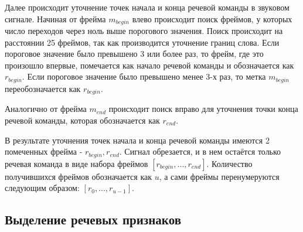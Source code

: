 Далее происходит уточнение точек начала и конца речевой команды в звуковом сигнале. Начиная от фрейма $m_{begin}$ влево происходит поиск фреймов, у которых число переходов через ноль выше порогового значения. Поиск происходит на расстоянии 25 фреймов, так как производится уточнение границ слова. Если пороговое значение было превышено 3 или более раз, то фрейм, где это произошло впервые, помечается как начало речевой команды и обозначается как $r_{begin}$. Если пороговое значение было превышено менее 3-х раз, то метка $m_{begin}$ переобозначается как $r_{begin}$.

Аналогично от фрейма $m_{end}$ происходит поиск вправо для уточнения точки конца речевой команды, которая обозначается как $r_{end}$.

В результате уточнения точек начала и конца речевой команды имеются 2 помеченных фрейма - $r_{begin}, r_{end}$. Сигнал обрезается, и в нем остаётся только речевая команда в виде набора фреймов $[r_{begin}, ... , r_{end}]$. Количество получившихся фреймов обозначается как $u$, а сами фреймы перенумеруются следующим образом: $[r_0, ... , r_{u-1}]$.

\subsection{Выделение речевых признаков}
